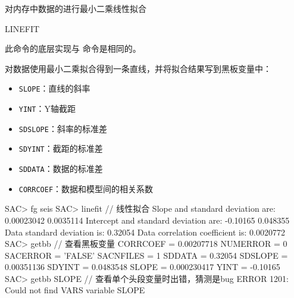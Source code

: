 \label{cmd:linefit}

对内存中数据的进行最小二乘线性拟合

\begin{SACSTX}
LINEFIT
\end{SACSTX}

此命令的底层实现与  命令是相同的。

对数据使用最小二乘拟合得到一条直线，并将拟合结果写到黑板变量中：
\begin{itemize}
\item \texttt{SLOPE}：直线的斜率
\item \texttt{YINT}：Y轴截距
\item \texttt{SDSLOPE}：斜率的标准差
\item \texttt{SDYINT}：截距的标准差
\item \texttt{SDDATA}：数据的标准差
\item \texttt{CORRCOEF}：数据和模型间的相关系数
\end{itemize}

\begin{SACCode}
SAC> fg seis
SAC> linefit            // 线性拟合
 Slope and standard deviation are: 0.00023042 0.0035114
 Intercept and standard deviation are: -0.10165 0.048355
 Data standard deviation is: 0.32054
 Data correlation coefficient is: 0.0020772
SAC> getbb             // 查看黑板变量
 CORRCOEF     = 0.00207718
 NUMERROR = 0
 SACERROR = 'FALSE'
 SACNFILES = 1
 SDDATA     = 0.32054
 SDSLOPE     = 0.00351136
 SDYINT     = 0.0483548
 SLOPE     = 0.000230417
 YINT     = -0.10165
SAC> getbb SLOPE       // 查看单个头段变量时出错，猜测是bug
 ERROR 1201: Could not find VARS variable SLOPE
\end{SACCode}
